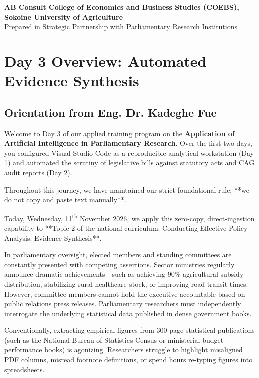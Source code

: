\documentclass[11pt, a4paper]{report}
\begin{document}
\begin{titlepage}
    \vfill
    {\footnotesize \textbf{AB Consult \textbullet{} College of Economics and Business Studies (COEBS), Sokoine University of Agriculture}\\
    Prepared in Strategic Partnership with Parliamentary Research Institutions}
    \vspace*{0.2cm}
\end{titlepage}

\tableofcontents
\newpage

\chapter{Day 3 Overview: Automated Evidence Synthesis}

\section{Orientation from Eng. Dr. Kadeghe Fue}
Welcome to Day 3 of our applied training program on the \textbf{Application of Artificial Intelligence in Parliamentary Research}. Over the first two days, you configured Visual Studio Code as a reproducible analytical workstation (Day 1) and automated the scrutiny of legislative bills against statutory acts and CAG audit reports (Day 2). 

Throughout this journey, we have maintained our strict foundational rule: **we do not copy and paste text manually**.

Today, Wednesday, 11\textsuperscript{th} November 2026, we apply this zero-copy, direct-ingestion capability to **Topic 2 of the national curriculum: Conducting Effective Policy Analysis: Evidence Synthesis**.

In parliamentary oversight, elected members and standing committees are constantly presented with competing assertions. Sector ministries regularly announce dramatic achievements---such as achieving 90\% agricultural subsidy distribution, stabilizing rural healthcare stock, or improving road transit times. However, committee members cannot hold the executive accountable based on public relations press releases. Parliamentary researchers must independently interrogate the underlying statistical data published in dense government books.

Conventionally, extracting empirical figures from 300-page statistical publications (such as the National Bureau of Statistics Census or ministerial budget performance books) is agonizing. Researchers struggle to highlight misaligned PDF columns, misread footnote definitions, or spend hours re-typing figures into spreadsheets.
\end{document}
